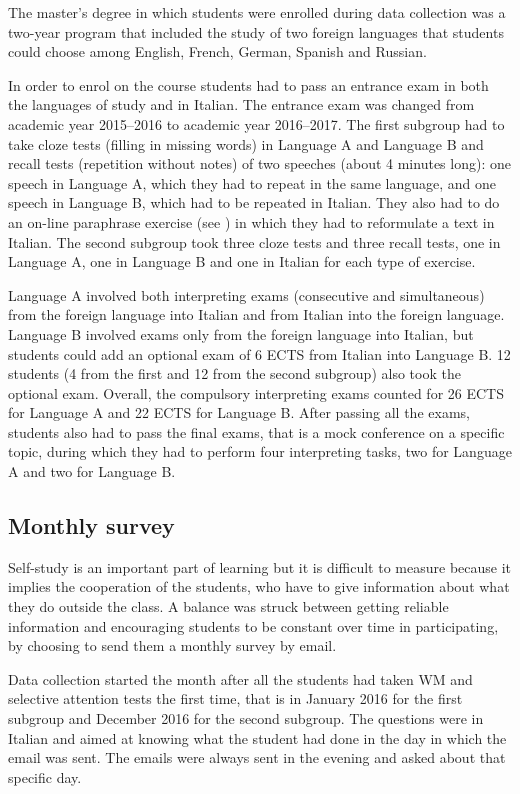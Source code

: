 \documentclass[output=paper]{../langscibook}
\begin{document}
The master’s degree in which students were enrolled during data collection was a two-year program that included the study of two foreign languages that students could choose among English, French, German, Spanish and Russian.

In order to enrol on the course students had to pass an entrance exam in both the languages of study and in Italian. The entrance exam was changed from academic year 2015--2016 to academic year 2016--2017. The first subgroup had to take cloze tests (filling in missing words) in Language A and Language B and recall tests (repetition without notes) of two speeches (about 4 minutes long): one speech in Language A, which they had to repeat in the same language, and one speech in Language B, which had to be repeated in Italian. They also had to do an on-line paraphrase exercise (see ) in which they had to reformulate a text in Italian. The second subgroup took three cloze tests and three recall tests, one in Language A, one in Language B and one in Italian for each type of exercise.

Language A involved both interpreting exams (consecutive and simultaneous) from the foreign language into Italian and from Italian into the foreign language. Language B involved exams only from the foreign language into Italian, but students could add an optional exam of 6 ECTS from Italian into Language B. 12 students (4 from the first and 12 from the second subgroup) also took the optional exam. Overall, the compulsory interpreting exams counted for 26 ECTS for Language A and 22 ECTS for Language B. After passing all the exams, students also had to pass the final exams, that is a mock conference on a specific topic, during which they had to perform four interpreting tasks, two for Language A and two for Language B.



\subsection{Monthly survey}

Self-study is an important part of learning but it is difficult to measure because it implies the cooperation of the students, who have to give information about what they do outside the class. A balance was struck between getting reliable information and encouraging students to be constant over time in participating, by choosing to send them a monthly survey by email.

Data collection started the month after all the students had taken WM and selective attention tests the first time, that is in January 2016 for the first subgroup and December 2016 for the second subgroup. The questions were in Italian and aimed at knowing what the student had done in the day in which the email was sent. The emails were always sent in the evening and asked about that specific day.
\end{document}
